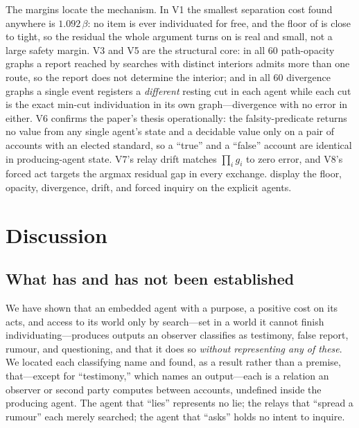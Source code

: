 \documentclass[11pt,twocolumn,a4paper]{article}
\newcommand{\flo}{\beta}
\begin{document}
The margins locate the mechanism. In V1 the smallest separation cost found
anywhere is $1.092\,\flo$: no item is ever individuated for free, and the
floor of  is close to tight, so the residual the whole
argument turns on is real and small, not a large safety margin. V3 and V5 are
the structural core: in all $60$ path-opacity graphs a report reached by
searches with distinct interiors admits more than one route, so the report
does not determine the interior; and in all $60$ divergence graphs a single
event registers a \emph{different} resting cut in each agent while each cut is
the exact min-cut individuation in its own graph---divergence with no error in
either. V6 confirms the paper's thesis operationally: the falsity-predicate
returns no value from any single agent's state and a decidable value only on a
pair of accounts with an elected standard, so a ``true'' and a ``false''
account are identical in producing-agent state. V7's relay drift matches
$\prod_i g_i$ to zero error, and V8's forced act targets the argmax residual
gap in every exchange.  display the floor,
opacity, divergence, drift, and forced inquiry on the explicit agents.




\section{Discussion}
\label{sec:discussion}

\subsection{What has and has not been established}

We have shown that an embedded agent with a purpose, a positive cost on its
acts, and access to its world only by search---set in a world it cannot
finish individuating---produces outputs an observer classifies as testimony,
false report, rumour, and questioning, and that it does so \emph{without
representing any of these}. We located each classifying name and found, as a
result rather than a premise, that---except for ``testimony,'' which names an
output---each is a relation an observer or second party computes between
accounts, undefined inside the producing agent. The agent that ``lies''
represents no lie; the relays that ``spread a rumour'' each merely searched;
the agent that ``asks'' holds no intent to inquire.
\end{document}

